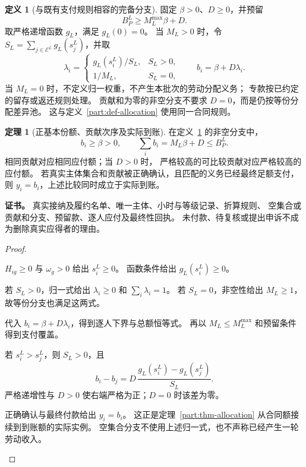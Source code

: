 \documentclass[UTF8,12pt,a4paper,openany,fontset=none,zihao=false]{ctexrep}
\theoremstyle{definition}
\newtheorem{definition}{定义}[chapter]
\newtheorem{theorem}{定理}[chapter]
\newenvironment{certificate}{\par\noindent\textbf{证书。}\ignorespaces}{\par}
\newcommand{\1}{\mathbf 1}
\begin{document}
\begin{definition}[与既有支付规则相容的完备分支]
\label{rights:allocation}
固定 \(\beta>0\)、\(D\ge0\)，并预留
\[
B^L_P\ge M_L^{\max}\beta+D.
\]
取严格递增函数 \(g_L\)，满足 \(g_L(0)=0\)。
当 \(M_L>0\) 时，令 \(S_L=\sum_{j\in\mathcal E^L}g_L(s_j^L)\)，并取
\[
\lambda_i=
\begin{cases}
g_L(s_i^L)/S_L,&S_L>0,\\
1/M_L,&S_L=0,
\end{cases}
\qquad b_i=\beta+D\lambda_i.
\]
当 \(M_L=0\) 时，不定义归一权重，不产生本批次的劳动分配义务；
专款按已约定的留存或返还规则处理。
贡献和为零的非空分支不要求 \(D=0\)，而是仍按等份分配差异池。
这与定义~\ref{part:def-allocation} 使用同一合同规则。
\end{definition}

\begin{theorem}[正基本份额、贡献次序及实际到账]
\label{rights:pay-coverage}
在定义~\ref{rights:allocation} 的非空分支中，
\[
b_i\ge\beta>0,\qquad
\sum_i b_i=M_L\beta+D\le B^L_P.
\]
相同贡献对应相同应付额；当 \(D>0\) 时，
严格较高的可比较贡献对应严格较高的应付额。
若真实主体集合和贡献被正确确认，且匹配的义务已经最终足额支付，
则 \(y_i=b_i\)，上述比较同时成立于实际到账。
\end{theorem}
\begin{certificate}
真实接纳及履约名单、唯一主体、小时与等级记录、折算规则、
空集合或贡献和分支、预留款、逐人应付及最终性回执。
未付款、待复核或提出申诉不成为删除真实应得者的理由。
\end{certificate}
\begin{proof}
\begin{semanticsteps}
\item \(H_{ig}\ge0\) 与 \(\omega_g>0\) 给出 \(s_i^L\ge0\)。
函数条件给出 \(g_L(s_i^L)\ge0\)。
\item 若 \(S_L>0\)，归一式给出 \(\lambda_i\ge0\) 和 \(\sum_i\lambda_i=1\)。
若 \(S_L=0\)，非空性给出 \(M_L\ge1\)，故等份分支也满足这两式。
\item 代入 \(b_i=\beta+D\lambda_i\)，得到逐人下界与总额恒等式。
再以 \(M_L\le M_L^{\max}\) 和预留条件得到支付覆盖。
\item 若 \(s_i^L>s_j^L\)，则 \(S_L>0\)，且
\[
b_i-b_j
=D\,\frac{g_L(s_i^L)-g_L(s_j^L)}{S_L}.
\]
严格递增性与 \(D>0\) 使右端严格为正；\(D=0\) 时该差为零。
\item 正确确认与最终付款给出 \(y_i=b_i\)。
这正是定理~\ref{part:thm-allocation} 从合同额接续到到账额的实际实例。
空集合分支不使用上述归一式，也不声称已经产生一轮劳动收入。
\end{semanticsteps}
\end{proof}
\end{document}
